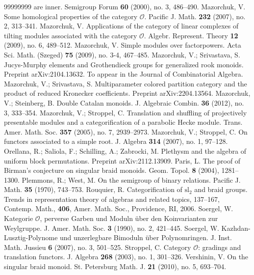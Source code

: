 \documentclass[a4paper]{amsart}
\begin{document}
\begin{thebibliography}{99999999}
are inner. Semigroup Forum {\bf 60} (2000), no. 3, 486--490.
 Mazorchuk, V. Some homological properties of 
the category $\mathcal{O}$. Pacific J. Math. {\bf 232} (2007), no. 2, 313--341.
 Mazorchuk, V. Applications of the category of 
linear complexes of tilting modules associated with the category $\mathcal{O}$. 
Algebr. Represent. Theory {\bf 12} (2009), no. 6, 489--512.
 Mazorchuk, V. Simple modules over factorpowers.
Acta Sci. Math. (Szeged) {\bf 75} (2009), no. 3-4, 467--485. 
 Mazorchuk, V.; Srivastava, S.
Jucys-Murphy elements and Grothendieck groups for generalized rook monoids.
Preprint arXiv:2104.13632. To appear in the Journal of Combinatorial Algebra.
 Mazorchuk, V.; Srivastava, S.
Multiparameter colored partition category and the product of reduced Kronecker coefficients.
Preprint arXiv:2204.13564. 
 Mazorchuk, V.; Steinberg, B. Double Catalan monoids. 
J. Algebraic Combin. {\bf 36} (2012), no. 3, 333--354.
 Mazorchuk, V.; Stroppel, C. Translation and 
shuffling of projectively presentable modules and a categorification 
of a parabolic Hecke module. Trans. Amer. Math. Soc. {\bf 357} (2005), no. 7, 2939--2973. 
 Mazorchuk, V.; Stroppel, C. 
On functors associated to a simple root. J. Algebra {\bf 314} (2007), no. 1, 97--128.
 Orellana, R.; Saliola, F.; Schilling, A.; Zabrocki, M.
Plethysm and the algebra of uniform block permutations.
Preprint arXiv:2112.13909.
 Paris, L. The proof of Birman's conjecture 
on singular braid monoids. Geom. Topol. {\bf 8} (2004), 1281--1300.
 Plemmons, R.; West, M. On the semigroup of binary relations. 
Pacific J. Math. {\bf 35} (1970), 743--753.
 Rouquier, R. Categorification of $\mathrm{sl}_2$ and braid groups.
Trends in representation theory of algebras and related topics, 137--167, 
Contemp. Math., {\bf 406}, Amer. Math. Soc., Providence, RI, 2006. 
 Soergel, W. Kategorie $\mathcal{O}$, perverse Garben und 
Moduln {\"u}ber den Koinvarianten zur Weylgruppe. 
J. Amer. Math. Soc. {\bf 3} (1990), no. 2, 421--445.
 Soergel, W. Kazhdan-Lusztig-Polynome und unzerlegbare 
Bimoduln {\"u}ber Polynomringen. J. Inst. Math. Jussieu {\bf 6} (2007), no. 3, 501--525. 
 Stroppel, C. Category $\mathcal{O}$: gradings and translation 
functors. J. Algebra {\bf 268} (2003), no. 1, 301--326.
 Vershinin, V. On the singular braid monoid. 
St. Petersburg Math. J. {\bf 21} (2010), no. 5, 693--704.
\end{thebibliography}
\vspace{1cm}
\end{document}
